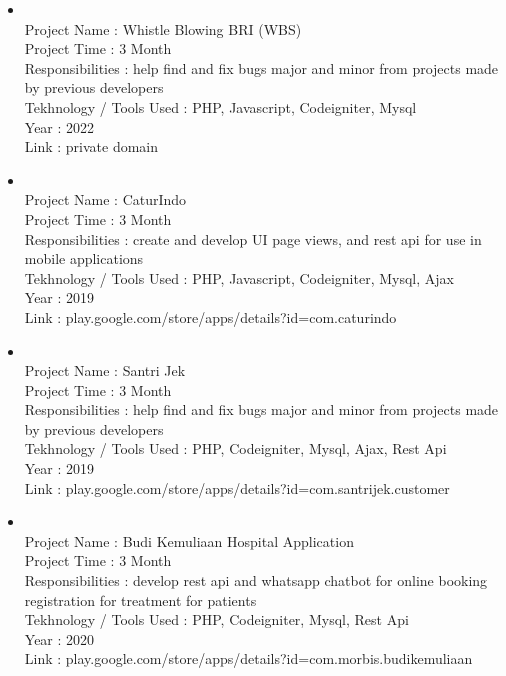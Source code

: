 \begin{itemize}
    \item {\color{LinkedInBlue} }\\ 
    \mybullet Project Name : Whistle Blowing BRI (WBS) \\
    \mybullet Project Time : 3 Month \\
    \mybullet Responsibilities : help find and fix bugs major and minor from projects made by previous developers \\
    \mybullet Tekhnology / Tools Used : PHP, Javascript, Codeigniter, Mysql \\
    \mybullet Year : 2022 \\
    \mybullet Link : private domain \\

    \item {\color{LinkedInBlue} }\\ 
    \mybullet Project Name : CaturIndo \\
    \mybullet Project Time : 3 Month \\
    \mybullet Responsibilities : create and develop UI page views, and rest api for use in mobile applications \\
    \mybullet Tekhnology / Tools Used : PHP, Javascript, Codeigniter, Mysql, Ajax \\
    \mybullet Year : 2019 \\
    \mybullet Link : play.google.com/store/apps/details?id=com.caturindo \\

    \item {\color{LinkedInBlue} }\\ 
    \mybullet Project Name : Santri Jek \\
    \mybullet Project Time : 3 Month \\
    \mybullet Responsibilities : help find and fix bugs major and minor from projects made by previous developers \\
    \mybullet Tekhnology / Tools Used : PHP, Codeigniter, Mysql, Ajax, Rest Api \\
    \mybullet Year : 2019 \\
    \mybullet Link : play.google.com/store/apps/details?id=com.santrijek.customer \\

    \item {\color{LinkedInBlue} }\\ 
    \mybullet Project Name : Budi Kemuliaan Hospital Application \\
    \mybullet Project Time : 3 Month \\
    \mybullet Responsibilities : develop rest api and whatsapp chatbot for online booking registration for treatment for patients \\
    \mybullet Tekhnology / Tools Used : PHP, Codeigniter, Mysql, Rest Api \\
    \mybullet Year : 2020 \\
    \mybullet Link : play.google.com/store/apps/details?id=com.morbis.budikemuliaan \\


\end{itemize}

